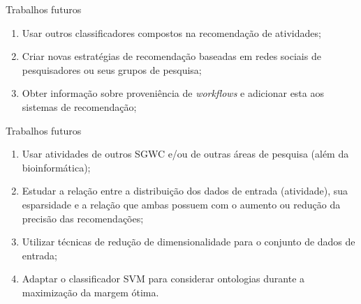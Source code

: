  \begin{frame}
 	\begin{block}{Trabalhos futuros}
 		\begin{enumerate}
 			\item Usar outros classificadores compostos na recomenda\c{c}\~ao de atividades;
 			\item Criar novas estrat\'egias de recomenda\c{c}\~ao baseadas em redes sociais de pesquisadores ou seus grupos de pesquisa;
 			\item Obter informa\c{c}\~ao sobre proveni\^encia de \emph{workflows} e adicionar esta aos sistemas de recomenda\c{c}\~ao;
 		
		\end{enumerate}		
 	\end{block}
 \end{frame}
 
 
 \begin{frame}
 	\begin{block}{Trabalhos futuros}
 		\begin{enumerate}
 			\item Usar atividades de outros SGWC e/ou de outras \'areas de pesquisa (al\'em da bioinform\'atica);
 			\item Estudar a rela\c{c}\~ao entre a distribui\c{c}\~ao dos dados de entrada (atividade), sua esparsidade e a rela\c{c}\~ao que ambas possuem com o aumento ou redu\c{c}\~ao da precis\~ao das recomenda\c{c}\~oes;
 			\item Utilizar t\'ecnicas de redu\c{c}\~ao de dimensionalidade para o conjunto de dados de entrada;
 			\item Adaptar o classificador SVM para considerar ontologias durante a maximiza\c{c}\~ao da margem \'otima.
 		\end{enumerate}		
 	\end{block}
 \end{frame}